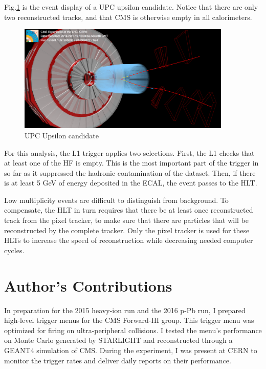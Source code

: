 Fig.\ref{fig:eventdisplayUPCUps} is the event display of a UPC upsilon candidate. Notice that there are only two reconstructed tracks, and that CMS is otherwise empty in all calorimeters. 

\begin{figure}[h!]
\begin{centering}
\includegraphics[width=4in]{Chapter3/importfigs/upcJpsi_run285530_lumi594_event944509077_v0.png}
\par\end{centering}
\caption{UPC Upsilon candidate \label{fig:eventdisplayUPCUps}}
\end{figure}

For this analysis, the L1 trigger applies two selections. First, the L1 checks that at least one of the HF is empty. This is the most important part of the trigger in so far as it suppressed the hadronic contamination of the dataset. Then, if there is at least 5 GeV of energy deposited in the ECAL, the event passes to the HLT. 

Low multiplicity events are difficult to distinguish from background. To compensate, the HLT in turn requires that there be at least once reconstructed track from the pixel tracker, to make sure that there are particles that will be reconstructed by the complete tracker. Only the pixel tracker is used for these HLTs to increase the speed of reconstruction while decreasing needed computer cycles. 

\section{Author's Contributions}

In preparation for the 2015 heavy-ion run and the 2016 p-Pb run, I prepared high-level trigger menus for the CMS Forward-HI group. This trigger menu was optimized for firing on ultra-peripheral collisions. I tested the menu's performance on Monte Carlo generated by STARLIGHT and reconstructed through a GEANT4 simulation of CMS. During the experiment, I was present at CERN to monitor the trigger rates and deliver daily reports on their performance. 


